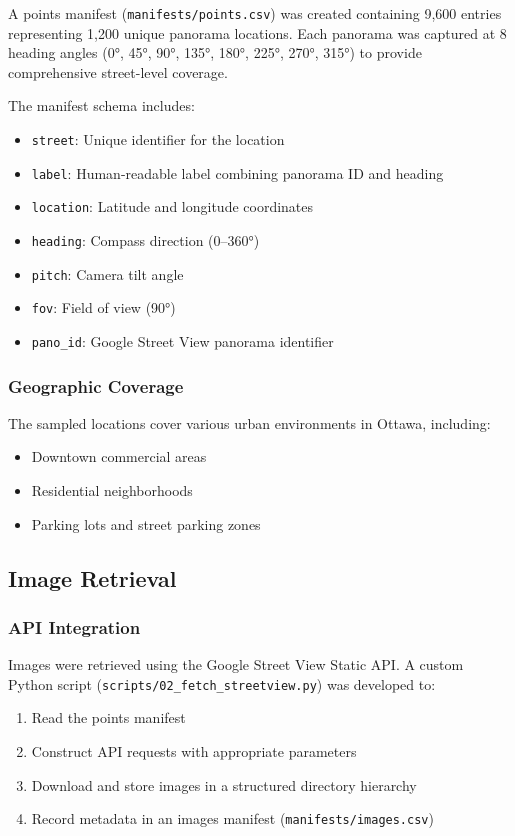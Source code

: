 \documentclass[12pt,a4paper]{article}
\begin{document}
A points manifest (\texttt{manifests/points.csv}) was created containing 9,600 entries representing 1,200 unique panorama locations. Each panorama was captured at 8 heading angles (0°, 45°, 90°, 135°, 180°, 225°, 270°, 315°) to provide comprehensive street-level coverage.

The manifest schema includes:
\begin{itemize}
	\item \texttt{street}: Unique identifier for the location
	\item \texttt{label}: Human-readable label combining panorama ID and heading
	\item \texttt{location}: Latitude and longitude coordinates
	\item \texttt{heading}: Compass direction (0--360°)
	\item \texttt{pitch}: Camera tilt angle
	\item \texttt{fov}: Field of view (90°)
	\item \texttt{pano\_id}: Google Street View panorama identifier
\end{itemize}

\subsubsection{Geographic Coverage}

The sampled locations cover various urban environments in Ottawa, including:
\begin{itemize}
	\item Downtown commercial areas
	\item Residential neighborhoods
	\item Parking lots and street parking zones
\end{itemize}

\subsection{Image Retrieval}

\subsubsection{API Integration}

Images were retrieved using the Google Street View Static API. A custom Python script (\texttt{scripts/02\_fetch\_streetview.py}) was developed to:

\begin{enumerate}
	\item Read the points manifest
	\item Construct API requests with appropriate parameters
	\item Download and store images in a structured directory hierarchy
	\item Record metadata in an images manifest (\texttt{manifests/images.csv})
\end{enumerate}
\end{document}
